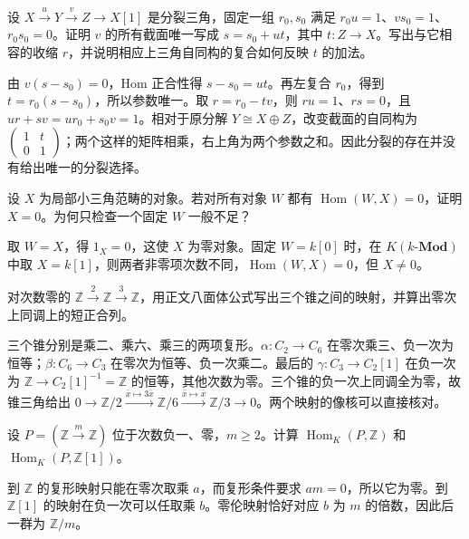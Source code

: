 \begin{exercise}\label{b4:ex:16-split-triangle}
设 \(X\xrightarrow{u}Y\xrightarrow{v}Z\to X[1]\) 是分裂三角，固定一组 \(r_0,s_0\) 满足 \(r_0u=1\)、\(vs_0=1\)、\(r_0s_0=0\)。证明 \(v\) 的所有截面唯一写成 \(s=s_0+ut\)，其中 \(t:Z\to X\)。写出与它相容的收缩 \(r\)，并说明相应上三角自同构的复合如何反映 \(t\) 的加法。
\end{exercise}
\begin{solution}
由 \(v(s-s_0)=0\)，Hom 正合性得 \(s-s_0=ut\)。再左复合 \(r_0\)，得到 \(t=r_0(s-s_0)\)，所以参数唯一。取 \(r=r_0-tv\)，则 \(ru=1\)、\(rs=0\)，且 \(ur+sv=ur_0+s_0v=1\)。相对于原分解 \(Y\cong X\oplus Z\)，改变截面的自同构为 \(\left(\begin{smallmatrix}1&t\\0&1\end{smallmatrix}\right)\)；两个这样的矩阵相乘，右上角为两个参数之和。因此分裂的存在并没有给出唯一的分裂选择。
\end{solution}

\begin{exercise}\label{b4:ex:16-detect-zero}
设 \(X\) 为局部小三角范畴的对象。若对所有对象 \(W\) 都有 \(\operatorname{Hom}(W,X)=0\)，证明 \(X=0\)。为何只检查一个固定 \(W\) 一般不足？
\end{exercise}
\begin{solution}
取 \(W=X\)，得 \(1_X=0\)，这使 \(X\) 为零对象。固定 \(W=k[0]\) 时，在 \(K(k\text{-}\mathbf{Mod})\) 中取 \(X=k[1]\)，则两者非零项次数不同，\(\operatorname{Hom}(W,X)=0\)，但 \(X\ne0\)。
\end{solution}

\begin{exercise}\label{b4:ex:16-octa-integers}
对次数零的 \(\mathbb Z\xrightarrow{2}\mathbb Z\xrightarrow{3}\mathbb Z\)，用正文八面体公式写出三个锥之间的映射，并算出零次上同调上的短正合列。
\end{exercise}
\begin{solution}
三个锥分别是乘二、乘六、乘三的两项复形。\(\alpha:C_2\to C_6\) 在零次乘三、负一次为恒等；\(\beta:C_6\to C_3\) 在零次为恒等、负一次乘二。最后的 \(\gamma:C_3\to C_2[1]\) 在负一次为 \(\mathbb Z\to C_2[1]^{-1}=\mathbb Z\) 的恒等，其他次数为零。三个锥的负一次上同调全为零，故锥三角给出 \(0\to\mathbb Z/2\xrightarrow{\bar x\mapsto3\bar x}\mathbb Z/6\xrightarrow{\bar x\mapsto\bar x}\mathbb Z/3\to0\)。两个映射的像核可以直接核对。
\end{solution}

\begin{exercise}\label{b4:ex:16-homotopy-limits}
设 \(P=(\mathbb Z\xrightarrow{m}\mathbb Z)\) 位于次数负一、零，\(m\ge2\)。计算 \(\operatorname{Hom}_K(P,\mathbb Z)\) 和 \(\operatorname{Hom}_K(P,\mathbb Z[1])\)。
\end{exercise}
\begin{solution}
到 \(\mathbb Z\) 的复形映射只能在零次取乘 \(a\)，而复形条件要求 \(am=0\)，所以它为零。到 \(\mathbb Z[1]\) 的映射在负一次可以任取乘 \(b\)。零伦映射恰好对应 \(b\) 为 \(m\) 的倍数，因此后一群为 \(\mathbb Z/m\)。
\end{solution}


